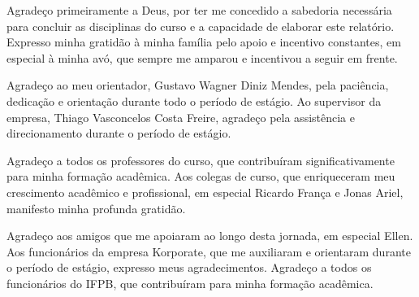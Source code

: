 \begin{agradecimentos}

Agradeço primeiramente a Deus, por ter me concedido a sabedoria necessária para 
concluir as disciplinas do curso e a capacidade de elaborar este relatório.
Expresso minha gratidão à minha família pelo apoio e incentivo constantes, 
em especial à minha avó, que sempre me amparou e incentivou a seguir em frente.

Agradeço ao meu orientador, Gustavo Wagner Diniz Mendes, pela paciência, dedicação e 
orientação durante todo o período de estágio.
Ao supervisor da empresa, Thiago Vasconcelos Costa Freire, agradeço pela assistência 
e direcionamento durante o período de estágio.

Agradeço a todos os professores do curso, que contribuíram significativamente para 
minha formação acadêmica.
Aos colegas de curso, que enriqueceram meu crescimento acadêmico e profissional, em 
especial Ricardo França e Jonas Ariel, manifesto minha profunda gratidão.

Agradeço aos amigos que me apoiaram ao longo desta jornada, em especial Ellen.
Aos funcionários da empresa Korporate, que me auxiliaram e orientaram durante o 
período de estágio, expresso meus agradecimentos.
Agradeço a todos os funcionários do IFPB, que contribuíram para minha formação 
acadêmica.


    
\end{agradecimentos}




